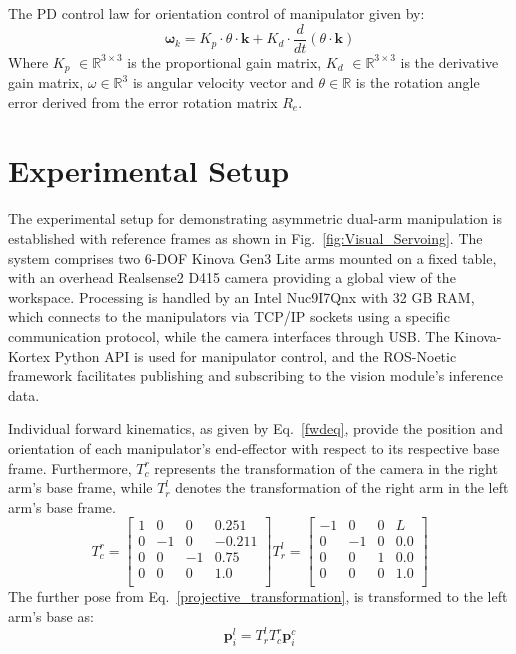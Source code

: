 \documentclass[utf8]{FrontiersinHarvard}
\begin{document}
\noindent The PD control law for orientation control of manipulator given by:
\begin{equation}
   \bm{\omega}_{k} = K_p \cdot {\theta} \cdot \bm{k} + K_d \cdot \frac{d}{dt} ({\theta} \cdot \bm{k})
    \label{angularvel}
\end{equation}
Where $K_{p}$ $\in \mathbb{R}^{3\times3}$ is the proportional gain matrix, $K_{d}$ $\in \mathbb{R}^{3\times3}$ is the derivative gain matrix, $\omega \in \mathbb{R}^{3}$ is angular velocity vector and $\theta \in \mathbb{R}$ is the rotation angle error derived from the error rotation matrix $R_{e}$.
\section{Experimental Setup}
\label{experimental_setp}
The experimental setup for demonstrating asymmetric dual-arm manipulation is established with reference frames as shown in Fig.~\ref{fig:Visual_Servoing}. The system comprises two 6-DOF Kinova Gen3 Lite arms mounted on a fixed table, with an overhead Realsense2 D415 camera providing a global view of the workspace. Processing is handled by an Intel Nuc9I7Qnx with 32 GB RAM, which connects to the manipulators via TCP/IP sockets using a specific communication protocol, while the camera interfaces through USB. The Kinova-Kortex Python API is used for manipulator control, and the ROS-Noetic framework facilitates publishing and subscribing to the vision module's inference data.

Individual forward kinematics, as given by Eq.~\ref{fwdeq}, provide the position and orientation of each manipulator's end-effector with respect to its respective base frame. Furthermore, $T^{r}_{c}$ represents the transformation of the camera in the right arm's base frame, while $T^{l}_{r}$ denotes the transformation of the right arm in the left arm's base frame.
\begin{equation*}
T^{r}_{c} = \begin{bmatrix}
1 & 0 & 0 & 0.251 \\
0 & -1& 0 & -0.211 \\
0 & 0 & -1 & 0.75 \\
0 & 0 & 0 & 1.0 \\
\end{bmatrix}
T^{l}_{r} = \begin{bmatrix}
-1 & 0 & 0 & L \\
0 & -1 & 0 & 0.0 \\
0 & 0 & 1 & 0.0 \\
0 & 0 & 0 & 1.0 \\
\end{bmatrix}
\end{equation*}
The further pose from Eq.~\ref{projective_transformation}, is transformed to the left arm's base as:
\begin{equation}
    \mathbf{p}^{l}_i = T^{l}_{r} T^{r}_{c} \mathbf{p}^{c}_{i}
\end{equation}
\end{document}
